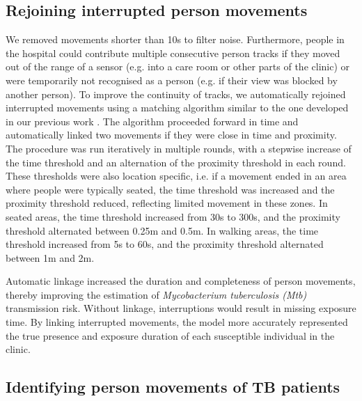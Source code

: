\documentclass[11pt]{article}
\begin{document}
\subsection{Rejoining interrupted person movements}\label{rejoining-interrupted-person-movements}

We removed movements shorter than 10s to filter noise. Furthermore, people in the hospital could contribute multiple consecutive person tracks if they moved out of the range of a sensor (e.g. into a care room or other parts of the clinic) or were temporarily not recognised as a person (e.g. if their view was blocked by another person). To improve the continuity of tracks, we automatically rejoined interrupted movements using a matching algorithm similar to the one developed in our previous work \cite{banholzer2025PLOSComputBiol}. The algorithm proceeded forward in time and automatically linked two movements if they were close in time and proximity. The procedure was run iteratively in multiple rounds, with a stepwise increase of the time threshold and an alternation of the proximity threshold in each round. These thresholds were also location specific, i.e. if a movement ended in an area where people were typically seated, the time threshold was increased and the proximity threshold reduced, reflecting limited movement in these zones. In seated areas, the time threshold increased from 30s to 300s, and the proximity threshold alternated between 0.25m and 0.5m. In walking areas, the time threshold increased from 5s to 60s, and the proximity threshold alternated between 1m and 2m.

Automatic linkage increased the duration and completeness of person movements, thereby improving the estimation of \emph{Mycobacterium tuberculosis (Mtb)} transmission risk. Without linkage, interruptions would result in missing exposure time. By linking interrupted movements, the model more accurately represented the true presence and exposure duration of each susceptible individual in the clinic.

\subsection{Identifying person movements of TB patients}\label{identifying-person-movements-of-tb-patients}
\end{document}
